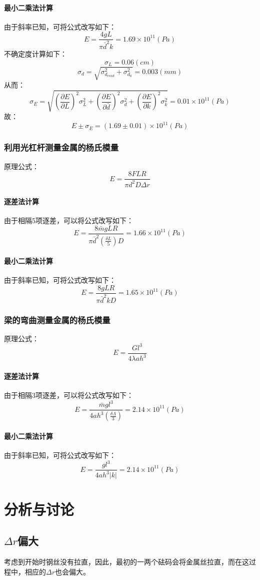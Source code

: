 \documentclass{ctexart}
\begin{document}
\paragraph{最小二乘法计算}
由于斜率已知，可将公式改写如下：
$$E=\frac{4gL}{\pi \bar{d}^2 k}=1.69\times 10^{11}(Pa)$$
不确定度计算如下：
$$\sigma_L=0.06(cm)$$
$$\sigma_d=\sqrt{\sigma_{d_{read}}^2+\sigma_{d_0}^2}=0.003(mm)$$
从而：
$$\sigma_E=\sqrt{(\frac{\partial E}{\partial L})^2\sigma_L^2+(\frac{\partial E}{\partial \bar{d}})^2\sigma_d^2+(\frac{\partial E}{\partial k })^2\sigma_k^2}=0.01\times 10^{11}(Pa)$$
故：$$E\pm \sigma_E=(1.69\pm 0.01)\times 10^{11}(Pa)$$
\subsubsection{利用光杠杆测量金属的杨氏模量}
原理公式：
$$E=\frac{8FLR}{\pi d^2 D\Delta r}$$
\paragraph{逐差法计算}
由于相隔5项逐差，可以将公式改写如下：
$$E=\frac{8\bar{m}gLR}{\pi \bar{d}^2 (\frac{\delta L}5 )D}=1.66\times 10^{11}(Pa)$$
\paragraph{最小二乘法计算}
由于斜率已知，可将公式改写如下：
$$E=\frac{8gLR}{\pi \bar{d}^2 kD}=1.65\times 10^{11}(Pa)$$
\subsubsection{梁的弯曲测量金属的杨氏模量}
原理公式：
$$E=\frac{Gl^3}{4 \lambda a h^3}$$
\paragraph{逐差法计算}
由于相隔3项逐差，可以将公式改写如下：
$$E=\frac{\bar{m} g l^3}{4 a h^3 (\frac{\delta \Lambda}3 )}=2.14\times 10^{11}(Pa)$$
\paragraph{最小二乘法计算}
由于斜率已知，可将公式改写如下：
$$E=\frac{gl^3}{4ah^3|k|}=2.14\times 10^{11}(Pa)$$


\section{分析与讨论}
\subsection{$\Delta r$偏大}考虑到开始时钢丝没有拉直，因此，最初的一两个砝码会将金属丝拉直，而在这过程中，相应的$\Delta r$也会偏大。
\end{document}

